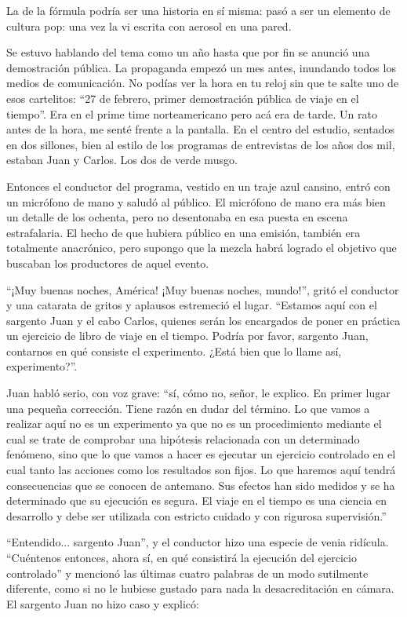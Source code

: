 \documentclass[12pt,twoside,openright]{book}
\begin{document}
La de la fórmula podría ser una historia en sí misma: pasó a ser un elemento de cultura pop: una vez la vi escrita con aerosol en una pared.

Se estuvo hablando del tema como un año hasta que por fin se anunció una demostración pública. La propaganda empezó un mes antes, inundando todos los medios de comunicación. No podías ver la hora en tu reloj sin que te salte uno de esos cartelitos: “27 de febrero, primer demostración pública de viaje en el tiempo”. Era en el prime time norteamericano pero acá era de tarde. Un rato antes de la hora, me senté frente a la pantalla. En el centro del estudio, sentados en dos sillones, bien al estilo de los programas de entrevistas de los años dos mil, estaban Juan y Carlos. Los dos de verde musgo.

Entonces el conductor del programa, vestido en un traje azul cansino, entró con un micrófono de mano y saludó al público. El micrófono de mano era más bien un detalle de los ochenta, pero no desentonaba en esa puesta en escena estrafalaria. El hecho de que hubiera público en una emisión, también era totalmente anacrónico, pero supongo que la mezcla habrá logrado el objetivo que buscaban los productores de aquel evento.

“¡Muy buenas noches, América! ¡Muy buenas noches, mundo!”, gritó el conductor y una catarata de gritos y aplausos estremeció el lugar. “Estamos aquí con el sargento Juan y el cabo Carlos, quienes serán los encargados de poner en práctica un ejercicio de libro de viaje en el tiempo. Podría por favor, sargento Juan, contarnos en qué consiste el experimento. ¿Está bien que lo llame así, experimento?”.

Juan habló serio, con voz grave: “sí, cómo no, señor, le explico. En primer lugar una pequeña corrección. Tiene razón en dudar del término. Lo que vamos a realizar aquí no es un experimento ya que no es un procedimiento mediante el cual se trate de comprobar una hipótesis relacionada con un determinado fenómeno, sino que lo que vamos a hacer es ejecutar un ejercicio controlado en el cual tanto las acciones como los resultados son fijos. Lo que haremos aquí tendrá consecuencias que se conocen de antemano. Sus efectos han sido medidos y se ha determinado que su ejecución es segura. El viaje en el tiempo es una ciencia en desarrollo y debe ser utilizada con estricto cuidado y con rigurosa supervisión.”

“Entendido... sargento Juan”, y el conductor hizo una especie de venia ridícula. “Cuéntenos entonces, ahora sí, en qué consistirá la ejecución del ejercicio controlado” y mencionó las últimas cuatro palabras de un modo sutilmente diferente, como si no le hubiese gustado para nada la desacreditación en cámara. El sargento Juan no hizo caso y explicó:
\end{document}

